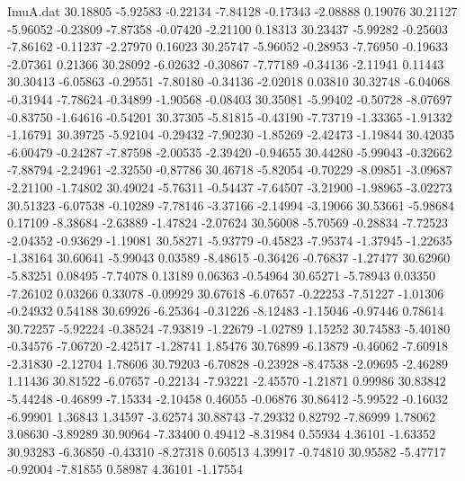 \begin{filecontents}{ImuA.dat}
  30.18805   -5.92583   -0.22134   -7.84128   -0.17343   -2.08888    0.19076
  30.21127   -5.96052   -0.23809   -7.87358   -0.07420   -2.21100    0.18313
  30.23437   -5.99282   -0.25603   -7.86162   -0.11237   -2.27970    0.16023
  30.25747   -5.96052   -0.28953   -7.76950   -0.19633   -2.07361    0.21366
  30.28092   -6.02632   -0.30867   -7.77189   -0.34136   -2.11941    0.11443
  30.30413   -6.05863   -0.29551   -7.80180   -0.34136   -2.02018    0.03810
  30.32748   -6.04068   -0.31944   -7.78624   -0.34899   -1.90568   -0.08403
  30.35081   -5.99402   -0.50728   -8.07697   -0.83750   -1.64616   -0.54201
  30.37305   -5.81815   -0.43190   -7.73719   -1.33365   -1.91332   -1.16791
  30.39725   -5.92104   -0.29432   -7.90230   -1.85269   -2.42473   -1.19844
  30.42035   -6.00479   -0.24287   -7.87598   -2.00535   -2.39420   -0.94655
  30.44280   -5.99043   -0.32662   -7.88794   -2.24961   -2.32550   -0.87786
  30.46718   -5.82054   -0.70229   -8.09851   -3.09687   -2.21100   -1.74802
  30.49024   -5.76311   -0.54437   -7.64507   -3.21900   -1.98965   -3.02273
  30.51323   -6.07538   -0.10289   -7.78146   -3.37166   -2.14994   -3.19066
  30.53661   -5.98684    0.17109   -8.38684   -2.63889   -1.47824   -2.07624
  30.56008   -5.70569   -0.28834   -7.72523   -2.04352   -0.93629   -1.19081
  30.58271   -5.93779   -0.45823   -7.95374   -1.37945   -1.22635   -1.38164
  30.60641   -5.99043    0.03589   -8.48615   -0.36426   -0.76837   -1.27477
  30.62960   -5.83251    0.08495   -7.74078    0.13189    0.06363   -0.54964
  30.65271   -5.78943    0.03350   -7.26102    0.03266    0.33078   -0.09929
  30.67618   -6.07657   -0.22253   -7.51227   -1.01306   -0.24932    0.54188
  30.69926   -6.25364   -0.31226   -8.12483   -1.15046   -0.97446    0.78614
  30.72257   -5.92224   -0.38524   -7.93819   -1.22679   -1.02789    1.15252
  30.74583   -5.40180   -0.34576   -7.06720   -2.42517   -1.28741    1.85476
  30.76899   -6.13879   -0.46062   -7.60918   -2.31830   -2.12704    1.78606
  30.79203   -6.70828   -0.23928   -8.47538   -2.09695   -2.46289    1.11436
  30.81522   -6.07657   -0.22134   -7.93221   -2.45570   -1.21871    0.99986
  30.83842   -5.44248   -0.46899   -7.15334   -2.10458    0.46055   -0.06876
  30.86412   -5.99522   -0.16032   -6.99901    1.36843    1.34597   -3.62574
  30.88743   -7.29332    0.82792   -7.86999    1.78062    3.08630   -3.89289
  30.90964   -7.33400    0.49412   -8.31984    0.55934    4.36101   -1.63352
  30.93283   -6.36850   -0.43310   -8.27318    0.60513    4.39917   -0.74810
  30.95582   -5.47717   -0.92004   -7.81855    0.58987    4.36101   -1.17554

\end{filecontents}
